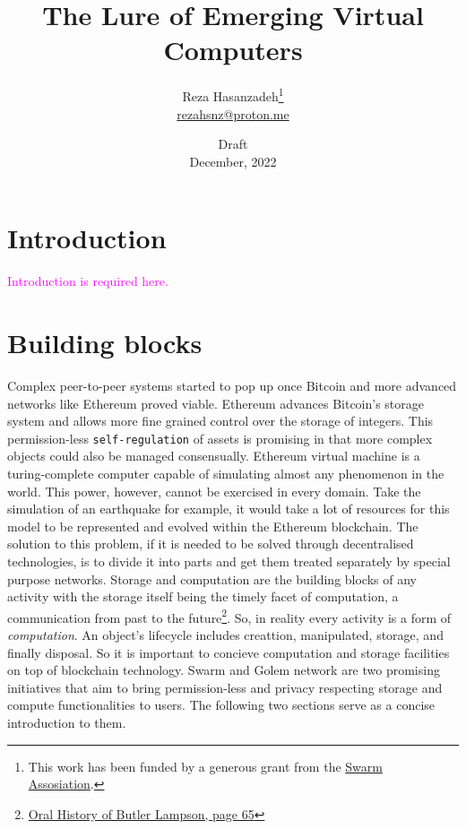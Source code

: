 \documentclass[a4paper, 10pt]{article}
\title{The Lure of Emerging Virtual Computers}
\author{Reza Hasanzadeh\thanks{This work has been funded by a generous grant from the \href{https://www.ethswarm.org
}{Swarm Assosiation}.}  \\ \href{mailto:rezahsnz@proton.me}{\small{rezahsnz@proton.me}}}
\date{\footnotesize{Draft} \\ \footnotesize{December, 2022}}
\begin{document}

\maketitle

\section{Introduction}
\textcolor{magenta}{Introduction is required here.}
\section{Building blocks}
Complex peer-to-peer systems started to pop up once Bitcoin and more advanced networks like Ethereum proved viable. Ethereum advances Bitcoin's storage system and allows more fine grained control over the storage of integers. This permission-less \texttt{self-regulation} of assets is promising in that more complex objects could also be managed consensually. Ethereum virtual machine is a turing-complete computer capable of simulating almost any phenomenon in the world. This power, however, cannot be exercised in every domain. Take the simulation of an earthquake for example, it would take a lot of resources for this model to be represented and evolved within the Ethereum blockchain. The solution to this problem, if it is needed to be solved through decentralised technologies, is to divide it into parts and get them treated separately by special purpose networks. Storage and computation are the building blocks of any activity with the storage itself being the timely facet of computation, a communication from past to the future\footnote{\href{https://www.computerhistory.org/collections/catalog/102658024}{Oral History of Butler Lampson, page 65}}. So, in reality every activity is a form of \textit{computation}. An object's lifecycle includes creattion, manipulated, storage, and finally disposal. So it is important to concieve computation and storage facilities on top of blockchain technology. Swarm and Golem network are two promising initiatives that aim to bring permission-less and privacy respecting storage and compute functionalities to users. The following two sections serve as a concise introduction to them.
\par
\end{document}
